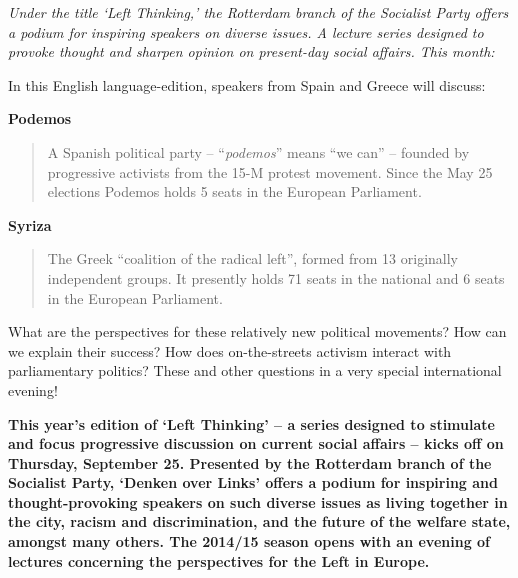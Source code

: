 \documentclass[12pt]{article}
\begin{document}

\emph{Under the title `Left Thinking,' the Rotterdam branch of the Socialist
Party offers a podium for inspiring speakers on diverse issues. A lecture
series designed to provoke thought and sharpen opinion on present-day social
affairs. This month:}

\vfill
\vfill


\vfill

In this English language-edition, speakers from Spain and Greece will discuss:

\textbf{\large Podemos}
\begin{quote}
  A Spanish political party -- ``\emph{podemos}'' means ``we can'' -- founded by
  progressive activists from the 15-M protest movement. Since the May 25 elections
  Podemos holds 5 seats in the European Parliament.
\end{quote}

\textbf{\large Syriza}
\begin{quote}
  The Greek ``coalition of the radical left'', formed from 13 originally
  independent groups. It presently holds 71 seats in the national and 6 seats
  in the European Parliament.
\end{quote}

\vfill

What are the perspectives for these relatively new political movements? How can 
we explain their success? How does on-the-streets 
activism interact with parlia\-mentary politics? These and other questions in a
very special international evening!

\DolHline

\newpage

\DolMega{\textcolor{DolRed}{Europe's New Left}}

\vfill

\textbf{This year's edition of `Left Thinking' -- a series designed to
stimulate and focus progressive discussion on current social affairs -- kicks
off on Thursday, September 25. Presented by the Rotterdam branch of the
Socialist Party, `Denken over Links' offers a podium for inspiring and
thought-provoking speakers on such diverse issues as living together in the
city, racism and discrimination, and the future of the welfare state, amongst
many others. The 2014/15 season opens with an evening of lectures
concerning the perspectives for the Left in Europe.}
\end{document}
